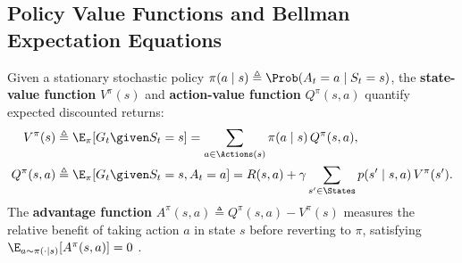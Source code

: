\documentclass[../../../../master.tex]{subfiles}
\begin{document}
\subsection{Policy Value Functions and Bellman Expectation Equations}
Given a stationary stochastic policy $\pi(a \mid s) \triangleq \Prob(A_t = a \mid S_t = s)$, the \textbf{state-value function} $V^\pi(s)$ and \textbf{action-value function} $Q^\pi(s, a)$ quantify expected discounted returns:
\begin{align}
  V^\pi(s) &\triangleq \E_\pi\!\left[G_t \given S_t = s\right] = \sum_{a \in \Actions(s)} \pi(a \mid s)\, Q^\pi(s, a), \label{eq:mdp:vpi_def} \\
  Q^\pi(s, a) &\triangleq \E_\pi\!\left[G_t \given S_t = s, A_t = a\right] = R(s, a) + \gamma \sum_{s' \in \States} p(s' \mid s, a)\, V^\pi(s'). \label{eq:mdp:qpi_def}
\end{align}
The \textbf{advantage function} $A^\pi(s, a) \triangleq Q^\pi(s, a) - V^\pi(s)$ measures the relative benefit of taking action $a$ in state $s$ before reverting to $\pi$, satisfying $\E_{a \sim \pi(\cdot \mid s)}[A^\pi(s, a)] = 0$ .
\end{document}
